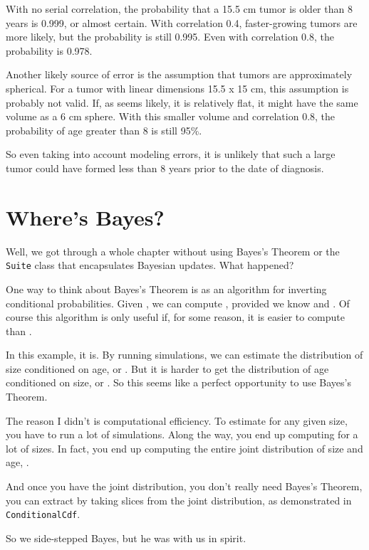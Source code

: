 \documentclass[12pt]{book}
\begin{document}
With no serial correlation, the probability that a
15.5 cm tumor is older than 8 years is 0.999, or almost certain.
With correlation 0.4, faster-growing tumors are more likely, but
the probability is still 0.995.  Even with correlation 0.8, the
probability is 0.978.

Another likely source of error is the assumption that tumors are
approximately spherical.  For a tumor with linear dimensions 15.5 x 15
cm, this assumption is probably not valid.  If, as seems likely, it
is relatively flat, it might have the same volume as a 6 cm sphere.
With this smaller volume and correlation 0.8, the probability of age
greater than 8 is still 95\%.

So even taking into account modeling errors, it is unlikely that such
a large tumor could have formed less than 8 years prior to the date of
diagnosis.


\section{Where's Bayes?}

Well, we got through a whole chapter without using Bayes's Theorem or
the {\tt Suite} class that encapsulates Bayesian updates.  What
happened?

One way to think about Bayes's Theorem is as an algorithm for
inverting conditional probabilities.  Given , we can compute
, provided we know  and .  Of course this algorithm
is only useful if, for some reason, it is easier to compute 
than .

In this example, it is.  By running simulations, we can estimate the
distribution of size conditioned on age, or .  But it is
harder to get the distribution of age conditioned on size, or
.  So this seems like a perfect opportunity to use Bayes's
Theorem.

The reason I didn't is computational efficiency.  To estimate
 for any given size, you have to run a lot of simulations.
Along the way, you end up computing  for a lot of sizes.
In fact, you end up computing the entire joint distribution of size
and age, .

And once you have the joint distribution, you don't really need
Bayes's Theorem, you can extract  by taking slices from
the joint distribution, as demonstrated in {\tt ConditionalCdf}.

So we side-stepped Bayes, but he was with us in spirit.
\end{document}
